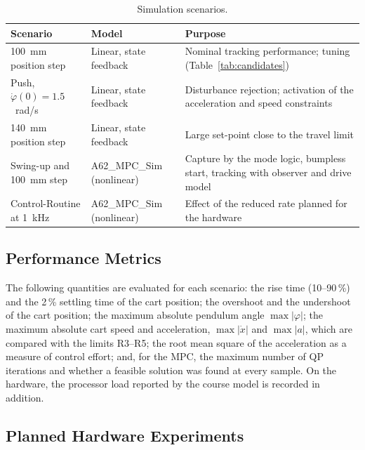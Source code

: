 \begin{table}[ht]
\centering
\caption{Simulation scenarios.}
\label{tab:scenarios}
\begin{tabular}{p{}p{}p{}}
\toprule
Scenario & Model & Purpose \\
\midrule
100~mm position step & Linear, state feedback & Nominal tracking performance; tuning (Table~\ref{tab:candidates}) \\
Push, $\dot{\varphi}(0) = 1.5$~rad/s & Linear, state feedback & Disturbance rejection; activation of the acceleration and speed constraints \\
140~mm position step & Linear, state feedback & Large set-point close to the travel limit \\
Swing-up and 100~mm step & A62\_MPC\_Sim (nonlinear) & Capture by the mode logic, bumpless start, tracking with observer and drive model \\
Control-Routine at 1~kHz & A62\_MPC\_Sim (nonlinear) & Effect of the reduced rate planned for the hardware \\
\bottomrule
\end{tabular}
\end{table}

\subsection{Performance Metrics}
\label{subsec:metrics}

The following quantities are evaluated for each scenario:
the rise time (10--90\,\%) and the 2\,\% settling time of the cart position;
the overshoot and the undershoot of the cart position; the maximum absolute
pendulum angle $\max|\varphi|$; the maximum absolute cart speed and
acceleration, $\max|\dot{x}|$ and $\max|a|$, which are compared with the limits
R3--R5; the root mean square of the acceleration as a measure of control
effort; and, for the \ac{MPC}, the maximum number of \ac{QP} iterations and
whether a feasible solution was found at every sample. On the hardware, the
processor load reported by the course model is recorded in addition.

\subsection{Planned Hardware Experiments}
\label{subsec:hwplan}

